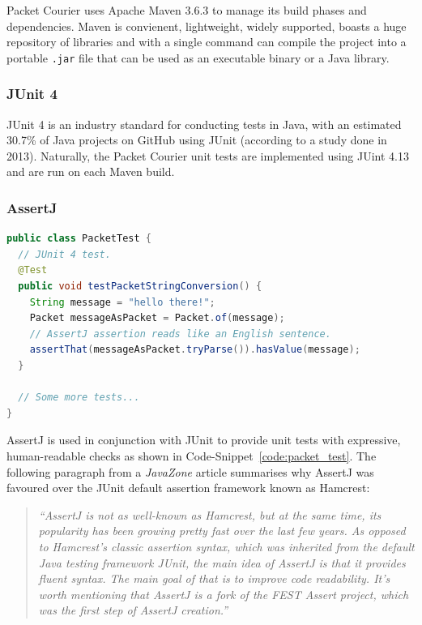 Packet Courier uses Apache Maven 3.6.3\cite{maven} to manage its build phases and dependencies. Maven is convienent,
lightweight, widely supported, boasts a huge repository of libraries\cite{maven_repository} and with a single
command can compile the project into a portable \texttt{.jar} file that can be used as an executable binary or a Java
library.

\subsubsection{JUnit 4}\label{subsubsection:junit_4}

JUnit 4\cite{juint4} is an industry standard for conducting tests in Java, with an estimated 30.7\% of Java projects on
GitHub using JUnit (according to a study done in 2013)\cite{java_library_popularity}. Naturally, the Packet Courier
unit tests are implemented using JUint 4.13 and are run on each Maven build.

\subsubsection{AssertJ}\label{subsubsection:assert_j}

\begin{lstlisting}[language=Java,caption={An example of a Packet Courier unit test using JUnit and AssertJ.},
    label={code:packet_test},captionpos=b]
public class PacketTest {
  // JUnit 4 test.
  @Test
  public void testPacketStringConversion() {
    String message = "hello there!";
    Packet messageAsPacket = Packet.of(message);
    // AssertJ assertion reads like an English sentence.
    assertThat(messageAsPacket.tryParse()).hasValue(message);
  }

  // Some more tests...
}
\end{lstlisting}


AssertJ\cite{assert_j} is used in conjunction with JUnit to provide unit tests with expressive, human-readable checks
as shown in Code-Snippet~\ref{code:packet_test}. The following paragraph from a \emph{JavaZone} article summarises
why AssertJ was favoured over the JUnit default assertion framework known as Hamcrest\cite{assert_j_vs_hamcrest}:
\begin{quote}
    \emph{``AssertJ is not as well-known as Hamcrest, but at the same time, its popularity has been growing pretty
    fast over the last few years. As opposed to Hamcrest’s classic assertion syntax, which was inherited from the
    default Java testing framework JUnit, the main idea of AssertJ is that it provides fluent syntax. The main goal
    of that is to improve code readability. It’s worth mentioning that AssertJ is a fork of the FEST Assert project,
        which was the first step of AssertJ creation.''}
\end{quote}

